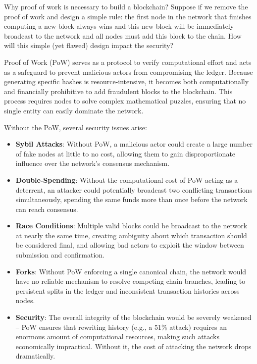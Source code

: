 \item[\textbf{Problem 14}]
Why proof of work is necessary to build a blockchain? Suppose if we remove the
proof of work and design a simple rule: the first node in the network that
finishes computing a new block always wins and this new block will be
immediately broadcast to the network and all nodes must add this block to the
chain. How will this simple (yet flawed) design impact the security?

\Solution

Proof of Work (PoW) serves as a protocol to verify computational effort and acts
as a safeguard to prevent malicious actors from compromising the ledger. Because
generating specific hashes is resource-intensive, it becomes both
computationally and financially prohibitive to add fraudulent blocks to the
blockchain. This process requires nodes to solve complex mathematical puzzles,
ensuring that no single entity can easily dominate the network.

Without the PoW, several security issues arise:
\begin{itemize}
    \item \textbf{Sybil Attacks}: Without PoW, a malicious actor could create a
    large number of fake nodes at little to no cost, allowing them to gain
    disproportionate influence over the network's consensus mechanism.

    \item \textbf{Double-Spending}: Without the computational cost of PoW acting
    as a deterrent, an attacker could potentially broadcast two conflicting
    transactions simultaneously, spending the same funds more than once before
    the network can reach consensus.
    
    \item \textbf{Race Conditions}: Multiple valid blocks could be broadcast to
    the network at nearly the same time, creating ambiguity about which
    transaction should be considered final, and allowing bad actors to exploit
    the window between submission and confirmation.

    \item \textbf{Forks}: Without PoW enforcing a single canonical chain, the
    network would have no reliable mechanism to resolve competing chain
    branches, leading to persistent splits in the ledger and inconsistent
    transaction histories across nodes.

    \item \textbf{Security}: The overall integrity of the blockchain would be
    severely weakened -- PoW ensures that rewriting history (e.g., a 51\%
    attack) requires an enormous amount of computational resources, making such
    attacks economically impractical. Without it, the cost of attacking the
    network drops dramatically.
\end{itemize}
